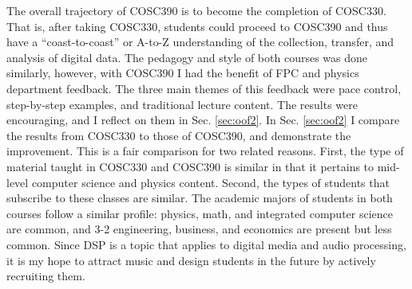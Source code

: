 \documentclass[../../../main.tex]{subfiles}
\begin{document}
The overall trajectory of COSC390 is to become the completion of COSC330.  That is, after taking COSC330, students could proceed to COSC390 and thus have a ``coast-to-coast'' or A-to-Z understanding of the collection, transfer, and analysis of digital data.  The pedagogy and style of both courses was done similarly, however, with COSC390 I had the benefit of FPC and physics department feedback.  The three main themes of this feedback were pace control, step-by-step examples, and traditional lecture content.  The results were encouraging, and I reflect on them in Sec. \ref{sec:oof2}.  In Sec. \ref{sec:oof2} I compare the results from COSC330 to those of COSC390, and demonstrate the improvement.  This is a fair comparison for two related reasons.  First, the type of material taught in COSC330 and COSC390 is similar in that it pertains to mid-level computer science and physics content.  Second, the types of students that subscribe to these classes are similar.  The academic majors of students in both courses follow a similar profile: physics, math, and integrated computer science are common, and 3-2 engineering, business, and economics are present but less common.  Since DSP is a topic that applies to digital media and audio processing, it is my hope to attract music and design students in the future by actively recruiting them.  \\ \hspace{0.1cm}
\end{document}
